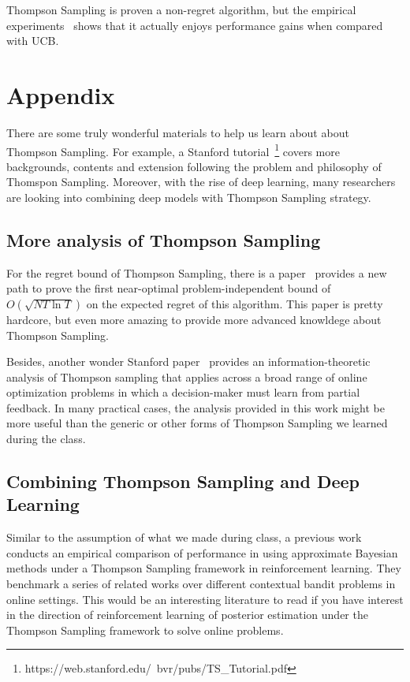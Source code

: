 \documentclass[11pt]{article}
\begin{document}
Thompson Sampling is proven a non-regret algorithm, but the empirical experiments~\cite{chapelle2011empirical} shows that it actually enjoys performance gains when compared with UCB.

{


}

\newpage
\section{Appendix}
There are some truly wonderful materials to help us learn about about Thompson Sampling. For example, a Stanford tutorial~\footnote{https://web.stanford.edu/~bvr/pubs/TS\_Tutorial.pdf} covers more backgrounds, contents and extension following the problem and philosophy of Thomspon Sampling. Moreover, with the rise of deep learning, many researchers are looking into combining deep models with Thompson Sampling strategy. 

\subsection{More analysis of Thompson Sampling}

For the regret bound of Thompson Sampling, there is a paper~\cite{agrawal2013further} provides a new path to prove  the first near-optimal problem-independent bound of $O(\sqrt {NT\ln T})$ on the expected regret of this algorithm. This paper is pretty hardcore, but even more amazing to provide more advanced knowldege about Thompson Sampling. 

Besides, another wonder Stanford paper~\cite{russo2016information} provides an information-theoretic analysis of Thompson sampling that applies across a broad range of online optimization problems in which a decision-maker must learn from partial feedback. In many practical cases, the analysis provided in this work might be more useful than the generic or other forms of Thompson Sampling we learned during the class.

\subsection{Combining Thompson Sampling and Deep Learning}

Similar to the assumption of what we made during class, a previous work~\cite{riquelme2018deep} conducts an empirical comparison of performance in using approximate
Bayesian methods under a Thompson Sampling framework in reinforcement learning. They benchmark a series of related works over different contextual bandit problems in online settings. This would be an interesting literature to read if you have interest in the direction of reinforcement learning of posterior estimation under the Thompson Sampling framework to solve online problems.
\end{document}
